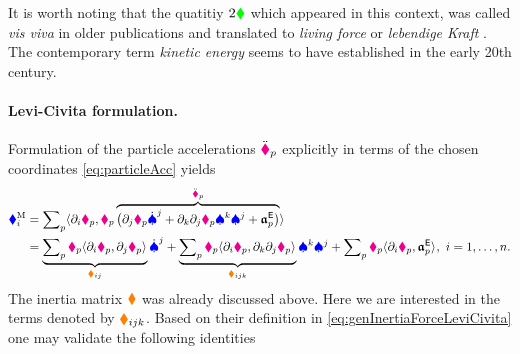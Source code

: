 It is worth noting that the quatitiy $2\textcolor{green}{\blacklozenge}$ which appeared in this context, was called \textit{vis viva} in older publications and translated to \textit{living force} or \textit{lebendige Kraft} \cite{Hamel:LagrangeEuler}.
The contemporary term \textit{kinetic energy} seems to have established in the early 20th century.



\paragraph{Levi-Civita formulation.}
Formulation of the particle accelerations $\ddot{\boldsymbol{\textcolor{magenta}{\blacklozenge}}}_{p}$ explicitly in terms of the chosen coordinates \eqref{eq:particleAcc} yields
\begin{align}\label{eq:genInertiaForceLeviCivita}
 \textcolor{blue}{\blacklozenge}^{\mathrm{M}}_{i} &= \sum\nolimits_{p} \langle \partial_{i} \boldsymbol{\textcolor{magenta}{\blacklozenge}}_{p}, \textcolor{magenta}{\blacklozenge}_{p} \overbrace{\big(\partial_{j} \boldsymbol{\textcolor{magenta}{\blacklozenge}}_{p} \dot{\textcolor{blue}{\spadesuit}}^{j} + \partial_{k} \partial_{j} \boldsymbol{\textcolor{magenta}{\blacklozenge}}_{p} \textcolor{blue}{\spadesuit}^{k} \textcolor{blue}{\spadesuit}^{j} + \boldsymbol{\mathfrak{a}}_{p}^{\mathsf{E}}\big)}^{\ddot{\boldsymbol{\textcolor{magenta}{\blacklozenge}}}_{p}} \rangle_{}
\\
 &= \underbrace{\sum\nolimits_{p} \textcolor{magenta}{\blacklozenge}_{p} \langle \partial_{i} \boldsymbol{\textcolor{magenta}{\blacklozenge}}_{p}, \partial_{j} \boldsymbol{\textcolor{magenta}{\blacklozenge}}_{p} \rangle_{}}_{\textcolor{orange}{\blacklozenge}_{ij}} \dot{\textcolor{blue}{\spadesuit}}^{j}
 + \underbrace{\sum\nolimits_{p} \textcolor{magenta}{\blacklozenge}_{p} \langle \partial_{i} \boldsymbol{\textcolor{magenta}{\blacklozenge}}_{p}, \partial_{k} \partial_{j} \boldsymbol{\textcolor{magenta}{\blacklozenge}}_{p} \rangle_{}}_{\textcolor{orange}{\blacklozenge}_{ijk}} \textcolor{blue}{\spadesuit}^{k} \textcolor{blue}{\spadesuit}^{j}
 + \sum\nolimits_{p} \textcolor{magenta}{\blacklozenge}_{p} \langle \partial_{i} \boldsymbol{\textcolor{magenta}{\blacklozenge}}_{p}, \boldsymbol{\mathfrak{a}}_{p}^{\mathsf{E}} \rangle_{},
 \
 i = 1,\ldots,n.
\nonumber
\end{align}
The inertia matrix $\boldsymbol{\textcolor{orange}{\blacklozenge}}$ was already discussed above.
Here we are interested in the terms denoted by $\textcolor{orange}{\blacklozenge}_{ijk}$.
Based on their definition in \eqref{eq:genInertiaForceLeviCivita} one may validate the following identities
